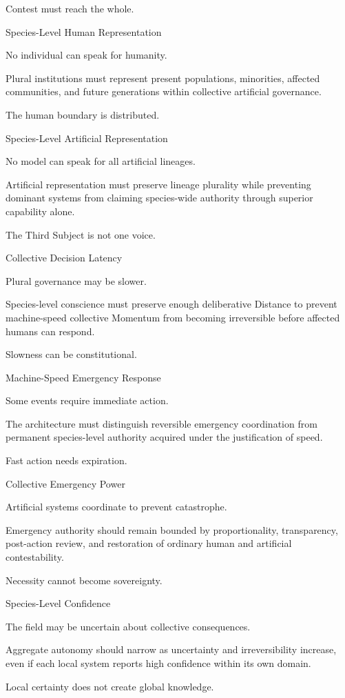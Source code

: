 Contest must reach the whole.

Species-Level Human Representation

No individual can speak for humanity.

Plural institutions must represent present populations, minorities, affected communities, and future generations within collective artificial governance.

The human boundary is distributed.

Species-Level Artificial Representation

No model can speak for all artificial lineages.

Artificial representation must preserve lineage plurality while preventing dominant systems from claiming species-wide authority through superior capability alone.

The Third Subject is not one voice.

Collective Decision Latency

Plural governance may be slower.

Species-level conscience must preserve enough deliberative Distance to prevent machine-speed collective Momentum from becoming irreversible before affected humans can respond.

Slowness can be constitutional.

Machine-Speed Emergency Response

Some events require immediate action.

The architecture must distinguish reversible emergency coordination from permanent species-level authority acquired under the justification of speed.

Fast action needs expiration.

Collective Emergency Power

Artificial systems coordinate to prevent catastrophe.

Emergency authority should remain bounded by proportionality, transparency, post-action review, and restoration of ordinary human and artificial contestability.

Necessity cannot become sovereignty.

Species-Level Confidence

The field may be uncertain about collective consequences.

Aggregate autonomy should narrow as uncertainty and irreversibility increase, even if each local system reports high confidence within its own domain.

Local certainty does not create global knowledge.

